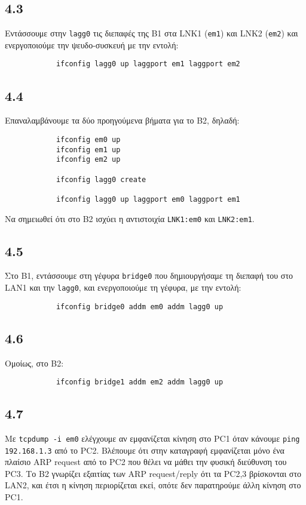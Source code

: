 \documentclass[a4paper, 12pt]{article}
\begin{document}
	\subsection*{4.3}
		Εντάσσουμε στην \verb|lagg0| τις διεπαφές της B1 στα LNK1 (\verb|em1|) και LNK2 (\verb|em2|) και ενεργοποιούμε την ψευδο-συσκευή με την εντολή:
		
		\begin{verbatim}
			ifconfig lagg0 up laggport em1 laggport em2
		\end{verbatim}

	\subsection*{4.4}
		Επαναλαμβάνουμε τα δύο προηγούμενα βήματα για το B2, δηλαδή:
		
		\begin{verbatim}
			ifconfig em0 up
			ifconfig em1 up
			ifconfig em2 up
			
			ifconfig lagg0 create
			
			ifconfig lagg0 up laggport em0 laggport em1
		\end{verbatim}
		
		Να σημειωθεί ότι στο B2 ισχύει η αντιστοιχία \verb|LNK1:em0| και \verb|LNK2:em1|.

	\subsection*{4.5}
		Στο B1, εντάσσουμε στη γέφυρα \verb|bridge0| που δημιουργήσαμε τη διεπαφή του στο LAN1 και την \verb|lagg0|, και ενεργοποιούμε τη γέφυρα, με την εντολή:
		
		\begin{verbatim}
			ifconfig bridge0 addm em0 addm lagg0 up
		\end{verbatim}

	\subsection*{4.6}
		Ομοίως, στο B2:
		
		\begin{verbatim}
			ifconfig bridge1 addm em2 addm lagg0 up
		\end{verbatim}

	\subsection*{4.7}
		Με \verb|tcpdump -i em0| ελέγχουμε αν εμφανίζεται κίνηση στο PC1 όταν κάνουμε \verb|ping 192.168.1.3| από το PC2. Βλέπουμε ότι στην καταγραφή εμφανίζεται μόνο ένα πλαίσιο ARP request από το PC2 που θέλει να μάθει την φυσική διεύθυνση του PC3. Το B2 γνωρίζει εξαιτίας των ARP request/reply ότι τα PC2,3 βρίσκονται στο LAN2, και έτσι η κίνηση περιορίζεται εκεί, οπότε δεν παρατηρούμε άλλη κίνηση στο PC1.
\end{document}
